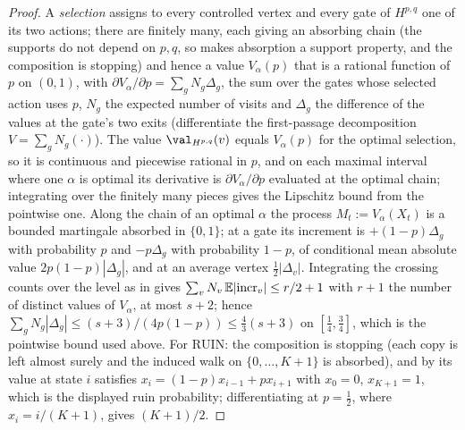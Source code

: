 \begin{proof}
A \emph{selection} assigns to every controlled vertex and every gate of
$H^{p,q}$ one of its two actions; there are finitely many, each giving an
absorbing chain (the supports do not depend on $p,q$, so
 makes absorption a support property, and the
composition is stopping) and hence a value $V_{\alpha}(p)$ that is a rational
function of $p$ on $(0,1)$, with
$\partial V_{\alpha}/\partial p=\sum_g N_g\Delta_g$, the sum over the gates
whose selected action uses $p$, $N_g$ the expected number of visits and
$\Delta_g$ the difference of the values at the gate's two exits (differentiate
the first-passage decomposition $V=\sum_g N_g(\cdot)$). The value
$\val_{H^{p,q}}(v)$ equals $V_\alpha(p)$ for the optimal selection, so it is
continuous and piecewise rational in $p$, and on each maximal interval where
one $\alpha$ is optimal its derivative is $\partial V_\alpha/\partial p$
evaluated at the optimal chain; integrating over the finitely many pieces gives
the Lipschitz bound from the pointwise one. Along the chain of an optimal
$\alpha$ the process $M_t:=V_{\alpha}(X_t)$ is a bounded martingale absorbed in
$\{0,1\}$; at a
gate its increment is $+(1-p)\Delta_g$ with probability $p$ and $-p\Delta_g$
with probability $1-p$, of conditional mean absolute value
$2p(1-p)|\Delta_g|$, and at an average vertex $\tfrac12|\Delta_v|$. Integrating
the crossing counts over the level as in  gives
$\sum_v N_v\,\mathbb E|{\rm incr}_v|\le r/2+1$ with $r+1$ the number of
distinct values of $V_{\alpha}$, at most $s+2$; hence
$\sum_gN_g|\Delta_g|\le(s+3)/(4p(1-p))\le\tfrac43(s+3)$ on
$[\tfrac14,\tfrac34]$, which is the pointwise bound used above. For $\mathrm{RUIN}$: the composition is stopping (each copy
is left almost surely and the induced walk on $\{0,\dots,K+1\}$ is absorbed),
and by  its value at state $i$ satisfies
$x_i=(1-p)x_{i-1}+px_{i+1}$ with $x_0=0$, $x_{K+1}=1$, which is the displayed
ruin probability; differentiating at $p=\tfrac12$, where $x_i=i/(K+1)$, gives
$(K+1)/2$.
\end{proof}

